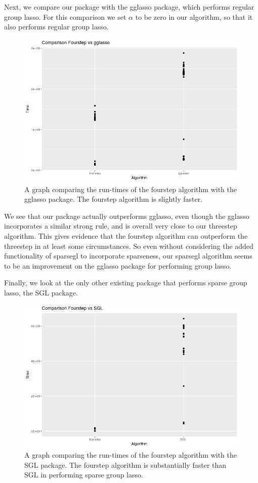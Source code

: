\documentclass[12pt]{article}
\begin{document}
Next, we compare our package with the gglasso package, which performs regular group lasso. For this comparison we set $\alpha$ to be zero in our algorithm, so that it also performs regular group lasso. 

\begin{figure}[tb!]
\centering
\includegraphics[scale=0.5]{fourvsgglasso.png}
\caption{A graph comparing the run-times of the fourstep algorithm with the gglasso package. The fourstep algorithm is slightly faster.}
\label{fig:1fourvsgglasso}
\end{figure}

We see that our package actually outperforms gglasso, even though the gglasso incorporates a similar strong rule, and is overall very close to our threestep algorithm. This gives evidence that the fourstep algorithm can outperform the threestep in at least some circumstances. So even without considering the added functionality of sparsegl to incorporate sparseness, our sparsegl algorithm seems to be an improvement on the gglasso package for performing group lasso.

Finally, we look at the only other existing package that performs sparse group lasso, the SGL package.


\begin{figure}[tb!]
\centering
\includegraphics[scale=0.5]{fourvsSGL.png}
\caption{A graph comparing the run-times of the fourstep algorithm with the SGL package. The fourstep algorithm is substantially faster than SGL in performing sparse group lasso.}
\label{fig:fourvsSGL}
\end{figure}
\end{document}
